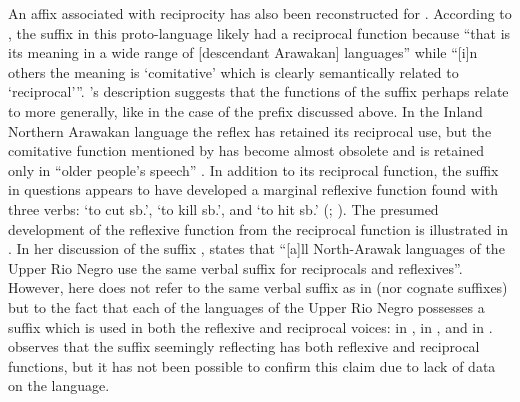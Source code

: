An affix associated with reciprocity has also been reconstructed for . According to \citet[109f.]{wise:1990}, the suffix  in this proto-language likely had a reciprocal function because “that is its meaning in a wide range of [descendant Arawakan] languages” while “[i]n others the meaning is ‘comitative’ which is clearly semantically related to ‘reciprocal’”. \citeauthor{wise:1990}’s description suggests that the functions of the  suffix  perhaps relate to  more generally, like in the case of the  prefix  discussed above. In the Inland Northern Arawakan language  the reflex  has retained its reciprocal use, but the comitative function mentioned by \citeauthor{wise:1990} has become almost obsolete and is retained only in “older people’s speech” \citep[264]{aikhenvald:2003}. In addition to its reciprocal function, the suffix in questions appears to have developed a marginal reflexive function found with three verbs:  ‘to cut sb.’,  ‘to kill sb.’, and  ‘to hit sb.’ (\citealt[266f.]{aikhenvald:2003}; \citeyear[1357]{aikhenvald:2007b}). The presumed development of the reflexive function from the reciprocal function is illustrated in . In her discussion of the  suffix , \citet[1357]{aikhenvald:2007b} states that “[a]ll North-Arawak languages of the Upper Rio Negro use the same verbal suffix for reciprocals and reflexives”. However, here \citet[847]{aikhenvald:2007b} does not refer to the same verbal suffix as in  (nor cognate suffixes) but to the fact that each of the languages of the Upper Rio Negro possesses a suffix which is used in both the reflexive and reciprocal voices:  in ,  in , and  in . \citet[104]{wise:1990} observes that the  suffix  seemingly reflecting   has both reflexive and reciprocal functions, but it has not been possible to confirm this claim due to lack of data on the language.

